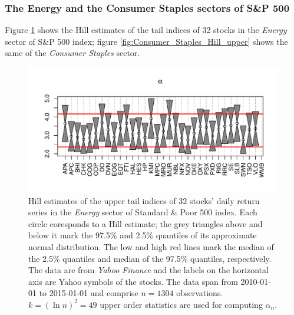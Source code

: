 \documentclass{article}
\begin{document}
\subsubsection{The Energy and the Consumer Staples sectors of S\&P 500}
Figure \ref{fig:Energy_Hill_upper} shows the Hill estimates of the
tail indices of 32 stocks in the {\it Energy} sector of S\&P 500
index; figure \ref{fig:Consumer_Staples_Hill_upper} shows the same of
the {\it Consumer Staples} sector.
\begin{figure}[htb!]
  \centering
  \includegraphics[width=\textwidth]{Energy_Hill_upper.pdf}
  \caption{Hill estimates of the upper tail indices of 32 stocks'
    daily return series in the {\it Energy} sector of Standard \& Poor
    500 index. Each circle coresponds to a Hill estimate; the grey
    triangles above and below it mark the 97.5\% and 2.5\% quantiles
    of its approximate normal distribution.
    The low and high red lines mark the median of the 2.5\% quantiles
    and median of the 97.5\% quantiles, respectively.
    The data are from {\it Yahoo Finance} and the labels on
    the horizontal axis are Yahoo symbols of the stocks. The data span
    from 2010-01-01 to 2015-01-01 and comprise $n=1304$
    observations. $k=(\ln n)^2 = 49$ upper order statistics are used
    for computing $\alpha_n$. 
  }
  \label{fig:Energy_Hill_upper}
\end{figure}
\end{document}
